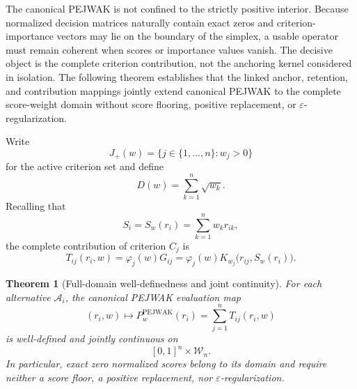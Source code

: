 \documentclass[reqno,11pt]{amsart}
\theoremstyle{definition}
\theoremstyle{plain}
\newtheorem{theorem}{Theorem}
\theoremstyle{remark}
\begin{document}
The canonical PEJWAK is not confined to the strictly positive interior.
Because normalized decision matrices naturally contain exact zeros and
criterion-importance vectors may lie on the boundary of the simplex, a
usable operator must remain coherent when scores or importance values
vanish. The decisive object is the complete criterion contribution, not
the anchoring kernel considered in isolation. The following theorem
establishes that the linked anchor, retention, and contribution mappings
jointly extend canonical PEJWAK to the complete score-weight domain
without score flooring, positive replacement, or
\(\varepsilon\)-regularization.


Write
\[
J_{+}(w)
=
\{j\in\{1,\ldots,n\}:w_j>0\}
\]
for the active criterion set and define
\[
D(w)
=
\sum_{k=1}^{n}\sqrt{w_k}.
\]
Recalling that
\[
S_i
=
S_w(r_i)
=
\sum_{k=1}^{n}w_kr_{ik},
\]
the complete contribution of criterion \(C_j\) is
\begin{equation*}
T_{ij}(r_i,w)
=
\varphi_j(w)G_{ij}
=
\varphi_j(w)
K_{w_j}\bigl(r_{ij},S_w(r_i)\bigr).
\end{equation*}

\begin{theorem}[Full-domain well-definedness and joint continuity]
\label{thm:boundary-joint-continuity}
For each alternative \(\mathcal A_i\), the canonical PEJWAK evaluation map
\[
(r_i,w)
\longmapsto
P_w^{\mathrm{PEJWAK}}(r_i)
=
\sum_{j=1}^{n}T_{ij}(r_i,w)
\]
is well-defined and jointly continuous on
\[
[0,1]^n\times\mathcal W_n.
\]
In particular, exact zero normalized scores belong to its domain and
require neither a score floor, a positive replacement, nor
\(\varepsilon\)-regularization.
\end{theorem}
\end{document}
